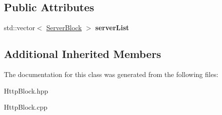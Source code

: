 \subsection*{Public Attributes}
\begin{DoxyCompactItemize}
\item 
\mbox{\label{classft_1_1HttpBlock_a28ef6a712a9345f796d39d3a91a6656a}} 
std\+::vector$<$ \hyperlink{classft_1_1ServerBlock}{Server\+Block} $>$ {\bfseries server\+List}
\end{DoxyCompactItemize}
\subsection*{Additional Inherited Members}


The documentation for this class was generated from the following files\+:\begin{DoxyCompactItemize}
\item 
Http\+Block.\+hpp\item 
Http\+Block.\+cpp\end{DoxyCompactItemize}
